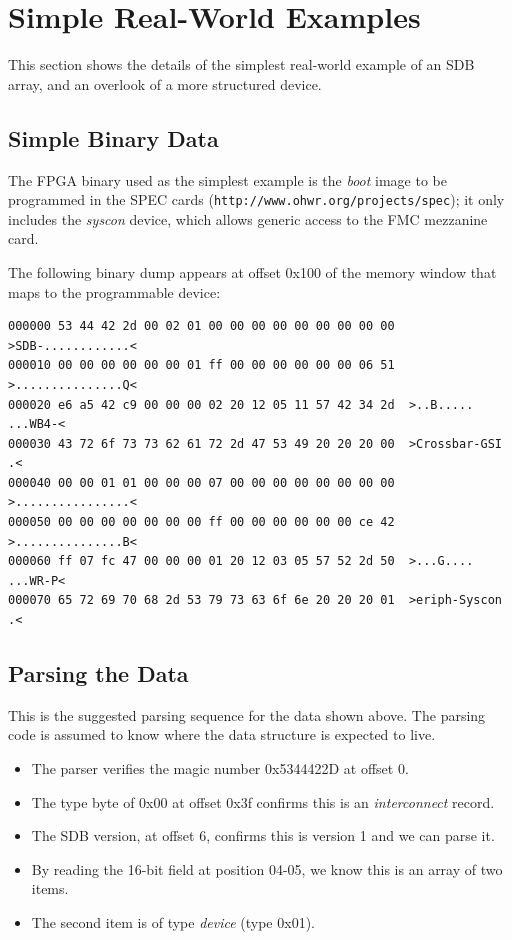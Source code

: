\documentclass[a4paper, 12pt]{article}
\begin{document}
\pagebreak 

\section{Simple Real-World Examples}

This section shows the details of the simplest real-world example of an SDB array,
and an overlook of a more structured device.

\subsection{Simple Binary Data}

The FPGA binary used as the simplest example is the \textit{boot} image to be
programmed in the SPEC cards
(\texttt{http://www.ohwr.org/projects/spec}); it only includes the
\textit{syscon} device, which allows generic access to the FMC
mezzanine card.

The following binary dump appears at offset 0x100 of the memory window
that maps to the programmable device:

\footnotesize
\begin{verbatim}
000000 53 44 42 2d 00 02 01 00 00 00 00 00 00 00 00 00  >SDB-............<
000010 00 00 00 00 00 00 01 ff 00 00 00 00 00 00 06 51  >...............Q<
000020 e6 a5 42 c9 00 00 00 02 20 12 05 11 57 42 34 2d  >..B..... ...WB4-<
000030 43 72 6f 73 73 62 61 72 2d 47 53 49 20 20 20 00  >Crossbar-GSI   .<
000040 00 00 01 01 00 00 00 07 00 00 00 00 00 00 00 00  >................<
000050 00 00 00 00 00 00 00 ff 00 00 00 00 00 00 ce 42  >...............B<
000060 ff 07 fc 47 00 00 00 01 20 12 03 05 57 52 2d 50  >...G.... ...WR-P<
000070 65 72 69 70 68 2d 53 79 73 63 6f 6e 20 20 20 01  >eriph-Syscon   .<
\end{verbatim}
\normalsize

\subsection{Parsing the Data}

This is the suggested parsing sequence for the data shown above. The
parsing code is assumed to know where the data structure is expected to live.

\begin{itemize}
\item The parser verifies the magic number 0x5344422D at offset 0.
\item The type byte of 0x00 at offset 0x3f confirms this is an \textit{interconnect} record.
\item The SDB version, at offset 6, confirms this is version 1 and we can parse it.
\item By reading the 16-bit field at position 04-05, we know this is an array of two items.
\item The second item is of type \textit{device} (type 0x01).
\end{itemize}
\end{document}
